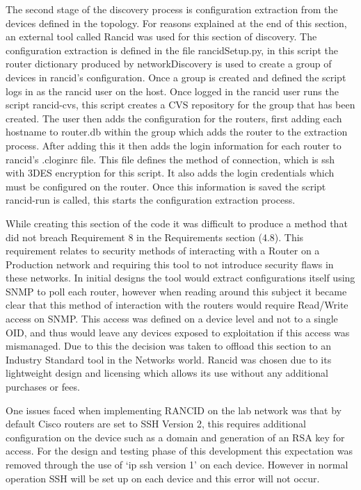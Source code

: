 \documentclass[11pt]{report}
\begin{document}
The second stage of the discovery process is configuration extraction from the devices defined in the topology. For reasons explained at the end of this section, an external tool called Rancid \citep{Rancid} was used for this section of discovery. The configuration extraction is defined in the file rancidSetup.py, in this script the router dictionary produced by networkDiscovery is used to create a group of devices in rancid's configuration. Once a group is created and defined the script logs in as the rancid user on the host. Once logged in the rancid user runs the script rancid-cvs, this script creates a CVS repository for the group that has been created. The user then adds the configuration for the routers, first adding each hostname to router.db within the group which adds the router to the extraction process. After adding this it then adds the login information for each router to rancid's .cloginrc file. This file defines the method of connection, which is ssh with 3DES encryption for this script. It also adds the login credentials which must be configured on the router. Once this information is saved the script rancid-run is called, this starts the configuration extraction process.

While creating this section of the code it was difficult to produce a method that did not breach Requirement 8 in the Requirements section (4.8). This requirement relates to security methods of interacting with a Router on a Production network and requiring this tool to not introduce security flaws in these networks. In initial designs the tool would extract configurations itself using SNMP to poll each router, however when reading around this subject it became clear that this method of interaction with the routers would require Read/Write access on SNMP. This access was defined on a device level and not to a single OID, and thus would leave any devices exposed to exploitation if this access was mismanaged. Due to this the decision was taken to offload this section to an Industry Standard tool in the Networks world. Rancid was chosen due to its lightweight design and licensing which allows its use without any additional purchases or fees.

One issues faced when implementing RANCID on the lab network was that by default Cisco routers are set to SSH Version 2, this requires additional configuration on the device such as a domain and generation of an RSA key for access. For the design and testing phase of this development this expectation was removed through the use of `ip ssh version 1' on each device. However in normal operation SSH will be set up on each device and this error will not occur.
\end{document}
